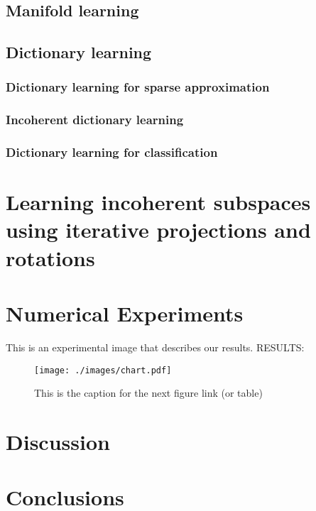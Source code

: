 \documentclass[]{article}
\begin{document}
\subsection{Manifold learning}
\label{sec-2-2}
\subsection{Dictionary learning}
\label{sec-2-3}
\subsubsection{Dictionary learning for sparse approximation}
\label{sec-2-3-1}
\subsubsection{Incoherent dictionary learning}
\label{sec-2-3-2}
\subsubsection{Dictionary learning for classification}
\label{sec-2-3-3}

\section{Learning incoherent subspaces using iterative projections and rotations}
\label{sec-3}
\section{Numerical Experiments}
\label{sec-4}
This is an experimental image that describes our results.
RESULTS:



\begin{figure}[htb]
\centering
\texttt{[image: ./images/chart.pdf]}
\caption{\label{fig:SED-HR4049}This is the caption for the next figure link (or table)}
\end{figure}
\section{Discussion}
\label{sec-5}
\section{Conclusions}
\label{sec-6}



\end{document}
